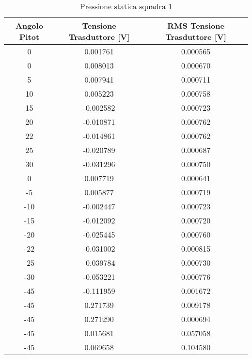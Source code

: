 \begin{table}[h]
\centering
\begin{tabular}{|c|c|c|}
\hline
Angolo Pitot & Tensione Trasduttore {[}V{]} & RMS Tensione Trasduttore {[}V{]} \\ \hline
0            & 0.001761                     & 0.000565                         \\ \hline
0            & 0.008013                     & 0.000670                         \\ \hline
5            & 0.007941                     & 0.000711                         \\ \hline
10           & 0.005223                     & 0.000758                         \\ \hline
15           & -0.002582                    & 0.000723                         \\ \hline
20           & -0.010871                    & 0.000762                         \\ \hline
22           & -0.014861                    & 0.000762                         \\ \hline
25           & -0.020789                    & 0.000687                         \\ \hline
30           & -0.031296                    & 0.000750                         \\ \hline
0            & 0.007719                     & 0.000641                         \\ \hline
-5           & 0.005877                     & 0.000719                         \\ \hline
-10          & -0.002447                    & 0.000723                         \\ \hline
-15          & -0.012092                    & 0.000720                         \\ \hline
-20          & -0.025445                    & 0.000760                         \\ \hline
-22          & -0.031002                    & 0.000815                         \\ \hline
-25          & -0.039784                    & 0.000730                         \\ \hline
-30          & -0.053221                    & 0.000776                         \\ \hline
-45          & -0.111959                    & 0.001672                         \\ \hline
-45          & 0.271739                     & 0.009178                         \\ \hline
-45          & 0.271290                     & 0.000694                         \\ \hline
-45          & 0.015681                     & 0.057058                         \\ \hline
-45          & 0.069658                     & 0.104580                         \\ \hline
\end{tabular}
\caption{Pressione statica squadra 1}
\end{table}

